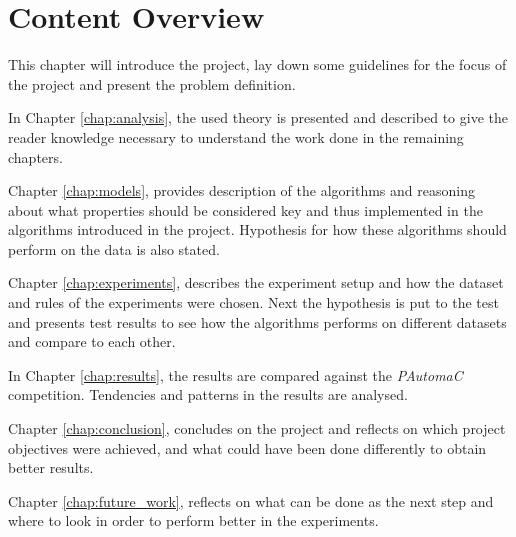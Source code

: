 \section{Content Overview}
This chapter will introduce the project, lay down some guidelines for the focus of the project and present the problem definition.

In Chapter \ref{chap:analysis}, the used theory is presented and described to give the reader knowledge necessary to understand the work done in the remaining chapters.

Chapter \ref{chap:models}, provides description of the algorithms and reasoning about what properties should be considered key and thus implemented in the algorithms introduced in the project. Hypothesis for how these algorithms should perform on the data is also stated.

Chapter \ref{chap:experiments}, describes the experiment setup and how the dataset and rules of the experiments were chosen. Next the hypothesis is put to the test and presents test results to see how the algorithms performs on different datasets and compare to each other.

In Chapter \ref{chap:results}, the results are compared against the \emph{PAutomaC} competition. Tendencies and patterns in the results are analysed.

Chapter \ref{chap:conclusion}, concludes on the project and reflects on which project objectives were achieved, and what could have been done differently to obtain better results.

Chapter \ref{chap:future_work}, reflects on what can be done as the next step and where to look in order to perform better in the experiments.